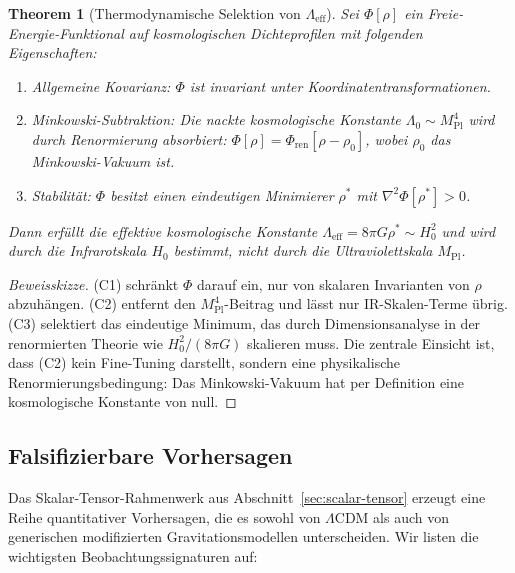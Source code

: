 \documentclass[12pt,a4paper]{article}
\theoremstyle{definition}
\theoremstyle{plain}
\newtheorem{theorem}[definition]{Theorem}
\theoremstyle{remark}
\begin{document}
\begin{theorem}[Thermodynamische Selektion von $\Lambda_{\mathrm{eff}}$]
\label{thm:lambda-selection}
Sei $\Phi[\rho]$ ein Freie-Energie-Funktional auf kosmologischen Dichteprofilen mit folgenden Eigenschaften:
\begin{enumerate}
\item[\textup{(C1)}] \emph{Allgemeine Kovarianz:} $\Phi$ ist invariant unter Koordinatentransformationen.
\item[\textup{(C2)}] \emph{Minkowski-Subtraktion:} Die nackte kosmologische Konstante $\Lambda_0 \sim M_{\mathrm{Pl}}^4$ wird durch Renormierung absorbiert: $\Phi[\rho] = \Phi_{\mathrm{ren}}[\rho - \rho_0]$, wobei $\rho_0$ das Minkowski-Vakuum ist.
\item[\textup{(C3)}] \emph{Stabilit\"at:} $\Phi$ besitzt einen eindeutigen Minimierer $\rho^*$ mit $\nabla^2 \Phi[\rho^*] > 0$.
\end{enumerate}
Dann erf\"ullt die effektive kosmologische Konstante $\Lambda_{\mathrm{eff}} = 8\pi G \rho^* \sim H_0^2$ und wird durch die Infrarotskala $H_0$ bestimmt, nicht durch die Ultraviolettskala $M_{\mathrm{Pl}}$.
\end{theorem}

\begin{proof}[Beweisskizze]
(C1) schr\"ankt $\Phi$ darauf ein, nur von skalaren Invarianten von $\rho$ abzuh\"angen.
(C2) entfernt den $M_{\mathrm{Pl}}^4$-Beitrag und l\"asst nur IR-Skalen-Terme \"ubrig.
(C3) selektiert das eindeutige Minimum, das durch Dimensionsanalyse in der
renormierten Theorie wie $H_0^2 / (8\pi G)$ skalieren muss.
Die zentrale Einsicht ist, dass (C2) kein Fine-Tuning darstellt, sondern eine
physikalische Renormierungsbedingung: Das Minkowski-Vakuum hat per Definition
eine kosmologische Konstante von null.
\end{proof}

\subsection{Falsifizierbare Vorhersagen}\label{sec:predictions-falsifiable}

Das Skalar-Tensor-Rahmenwerk aus Abschnitt~\ref{sec:scalar-tensor}
erzeugt eine Reihe quantitativer Vorhersagen, die es sowohl von
$\Lambda$CDM als auch von generischen modifizierten
Gravitationsmodellen unterscheiden. Wir listen die wichtigsten
Beobachtungssignaturen auf:
\end{document}
